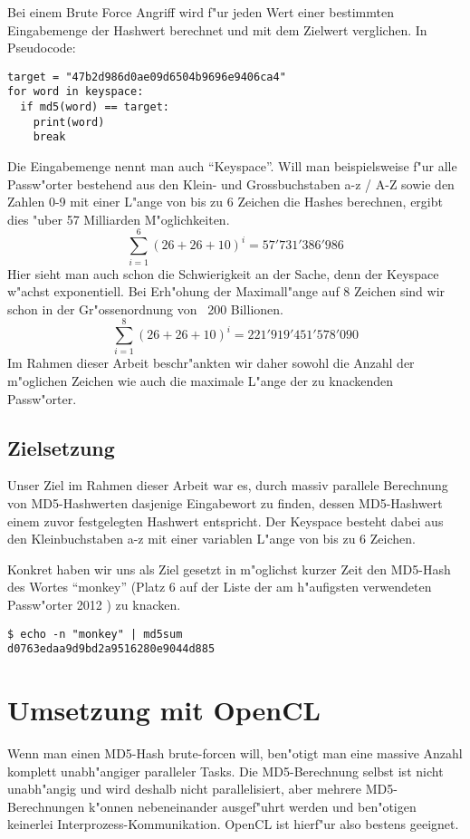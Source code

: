 \begin{refsection}
Bei einem Brute Force Angriff wird f"ur jeden Wert einer bestimmten
Eingabemenge der Hash\-wert berechnet und mit dem Zielwert verglichen. In
Pseudocode:

\begin{verbatim}
target = "47b2d986d0ae09d6504b9696e9406ca4"
for word in keyspace:
  if md5(word) == target:
    print(word)
    break
\end{verbatim}

Die Eingabemenge nennt man auch ``Keyspace''. Will man beispielsweise f"ur alle
Passw"orter bestehend aus den Klein- und Grossbuchstaben a-z / A-Z sowie den
Zahlen 0-9 mit einer L"ange von bis zu 6 Zeichen die Hashes berechnen, ergibt
dies "uber 57 Milliarden M"oglichkeiten.
\[
	\sum_{i=1}^{6} \left(26 + 26 + 10\right)^i = 57'731'386'986
\]
Hier sieht man auch schon die Schwierigkeit an der Sache, denn der Keyspace
w"achst exponentiell. Bei Erh"ohung der Maximall"ange auf 8 Zeichen sind wir schon
in der Gr"ossenordnung von ~200 Billionen.
\[
	\sum_{i=1}^{8} \left(26 + 26 + 10\right)^i = 221'919'451'578'090
\]
Im Rahmen dieser Arbeit beschr"ankten wir daher sowohl die Anzahl der m"oglichen
Zeichen wie auch die maximale L"ange der zu knackenden Passw"orter.

\subsection{Zielsetzung}

Unser Ziel im Rahmen dieser Arbeit war es, durch massiv parallele Berechnung von
MD5-Hashwerten dasjenige Eingabewort zu finden, dessen MD5-Hashwert einem zuvor
festgelegten Hashwert entspricht. Der Keyspace besteht dabei aus den
Kleinbuchstaben a-z mit einer variablen L"ange von bis zu 6 Zeichen.

Konkret haben wir uns als Ziel gesetzt in m"oglichst kurzer Zeit den MD5-Hash
des Wortes ``monkey'' (Platz 6 auf der Liste der am h"aufigsten verwendeten
Passw"orter 2012 \cite{crypto:splash2012}) zu knacken.

\begin{verbatim}
$ echo -n "monkey" | md5sum
d0763edaa9d9bd2a9516280e9044d885
\end{verbatim}

\section{Umsetzung mit OpenCL}

Wenn man einen MD5-Hash brute-forcen will, ben"otigt man eine massive Anzahl
komplett unabh"angiger paralleler Tasks. Die MD5-Berechnung selbst ist nicht
unabh"angig und wird deshalb nicht parallelisiert, aber mehrere MD5-Berechnungen
k"onnen nebeneinander ausgef"uhrt werden und ben"otigen keinerlei
Interprozess-Kommunikation. OpenCL ist hierf"ur also bestens geeignet.


\end{refsection}
